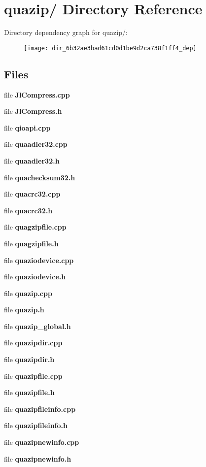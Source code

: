 \section{quazip/ Directory Reference}
\label{dir_6b32ae3bad61cd0d1be9d2ca738f1ff4}
Directory dependency graph for quazip/:
\nopagebreak
\begin{figure}[H]
\begin{center}
\leavevmode
\texttt{[image: dir\_6b32ae3bad61cd0d1be9d2ca738f1ff4\_dep]}
\end{center}
\end{figure}
\subsection*{Files}
\begin{DoxyCompactItemize}
\item 
file {\bfseries JlCompress.cpp}
\item 
file {\bfseries JlCompress.h}
\item 
file {\bfseries qioapi.cpp}
\item 
file {\bfseries quaadler32.cpp}
\item 
file {\bfseries quaadler32.h}
\item 
file {\bfseries quachecksum32.h}
\item 
file {\bfseries quacrc32.cpp}
\item 
file {\bfseries quacrc32.h}
\item 
file {\bfseries quagzipfile.cpp}
\item 
file {\bfseries quagzipfile.h}
\item 
file {\bfseries quaziodevice.cpp}
\item 
file {\bfseries quaziodevice.h}
\item 
file {\bfseries quazip.cpp}
\item 
file {\bfseries quazip.h}
\item 
file {\bfseries quazip\_\-global.h}
\item 
file {\bfseries quazipdir.cpp}
\item 
file {\bfseries quazipdir.h}
\item 
file {\bfseries quazipfile.cpp}
\item 
file {\bfseries quazipfile.h}
\item 
file {\bfseries quazipfileinfo.cpp}
\item 
file {\bfseries quazipfileinfo.h}
\item 
file {\bfseries quazipnewinfo.cpp}
\item 
file {\bfseries quazipnewinfo.h}
\end{DoxyCompactItemize}
